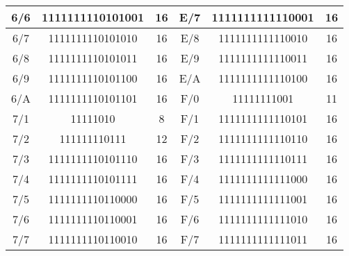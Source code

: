 \begin{table}[!ht]
\begin{tabular}{|c|c|c|c|c|c|}
6/6                                                        & 1111111110101001 & 16      & E/7                                                        & 1111111111110001 & 16      \\ \hline
6/7                                                        & 1111111110101010 & 16      & E/8                                                        & 1111111111110010 & 16      \\ \hline
6/8                                                        & 1111111110101011 & 16      & E/9                                                        & 1111111111110011 & 16      \\ \hline
6/9                                                        & 1111111110101100 & 16      & E/A                                                        & 1111111111110100 & 16      \\ \hline
6/A                                                        & 1111111110101101 & 16      & F/0                                                        & 11111111001      & 11      \\ \hline
7/1                                                        & 11111010         & 8       & F/1                                                        & 1111111111110101 & 16      \\ \hline
7/2                                                        & 111111110111     & 12      & F/2                                                        & 1111111111110110 & 16      \\ \hline
7/3                                                        & 1111111110101110 & 16      & F/3                                                        & 1111111111110111 & 16      \\ \hline
7/4                                                        & 1111111110101111 & 16      & F/4                                                        & 1111111111111000 & 16      \\ \hline
7/5                                                        & 1111111110110000 & 16      & F/5                                                        & 1111111111111001 & 16      \\ \hline
7/6                                                        & 1111111110110001 & 16      & F/6                                                        & 1111111111111010 & 16      \\ \hline
7/7                                                        & 1111111110110010 & 16      & F/7                                                        & 1111111111111011 & 16      \\ \hline

\end{tabular}
\end{table}
